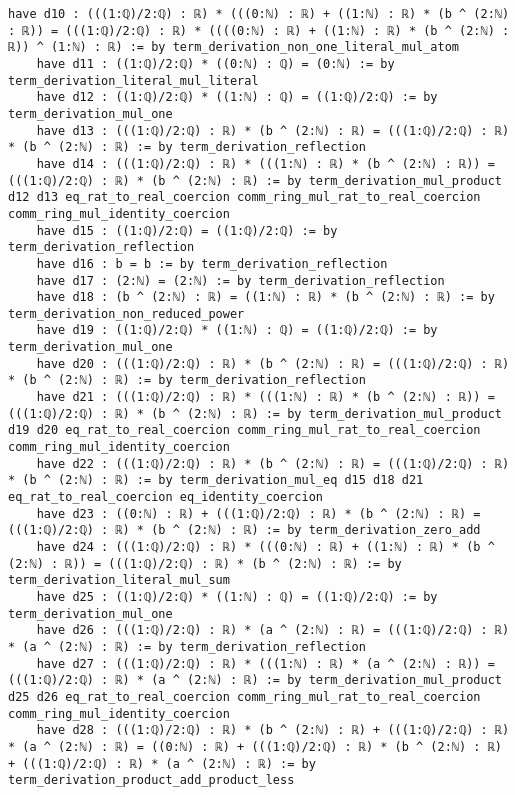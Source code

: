 \documentclass{article}
\begin{document}
\begin{tcolorbox}[colback=white!10, width=\linewidth]
\begin{lstlisting}[language=Lean4]
    have d10 : (((1:ℚ)/2:ℚ) : ℝ) * (((0:ℕ) : ℝ) + ((1:ℕ) : ℝ) * (b ^ (2:ℕ) : ℝ)) = (((1:ℚ)/2:ℚ) : ℝ) * ((((0:ℕ) : ℝ) + ((1:ℕ) : ℝ) * (b ^ (2:ℕ) : ℝ)) ^ (1:ℕ) : ℝ) := by term_derivation_non_one_literal_mul_atom
    have d11 : ((1:ℚ)/2:ℚ) * ((0:ℕ) : ℚ) = (0:ℕ) := by term_derivation_literal_mul_literal
    have d12 : ((1:ℚ)/2:ℚ) * ((1:ℕ) : ℚ) = ((1:ℚ)/2:ℚ) := by term_derivation_mul_one
    have d13 : (((1:ℚ)/2:ℚ) : ℝ) * (b ^ (2:ℕ) : ℝ) = (((1:ℚ)/2:ℚ) : ℝ) * (b ^ (2:ℕ) : ℝ) := by term_derivation_reflection
    have d14 : (((1:ℚ)/2:ℚ) : ℝ) * (((1:ℕ) : ℝ) * (b ^ (2:ℕ) : ℝ)) = (((1:ℚ)/2:ℚ) : ℝ) * (b ^ (2:ℕ) : ℝ) := by term_derivation_mul_product d12 d13 eq_rat_to_real_coercion comm_ring_mul_rat_to_real_coercion comm_ring_mul_identity_coercion
    have d15 : ((1:ℚ)/2:ℚ) = ((1:ℚ)/2:ℚ) := by term_derivation_reflection
    have d16 : b = b := by term_derivation_reflection
    have d17 : (2:ℕ) = (2:ℕ) := by term_derivation_reflection
    have d18 : (b ^ (2:ℕ) : ℝ) = ((1:ℕ) : ℝ) * (b ^ (2:ℕ) : ℝ) := by term_derivation_non_reduced_power
    have d19 : ((1:ℚ)/2:ℚ) * ((1:ℕ) : ℚ) = ((1:ℚ)/2:ℚ) := by term_derivation_mul_one
    have d20 : (((1:ℚ)/2:ℚ) : ℝ) * (b ^ (2:ℕ) : ℝ) = (((1:ℚ)/2:ℚ) : ℝ) * (b ^ (2:ℕ) : ℝ) := by term_derivation_reflection
    have d21 : (((1:ℚ)/2:ℚ) : ℝ) * (((1:ℕ) : ℝ) * (b ^ (2:ℕ) : ℝ)) = (((1:ℚ)/2:ℚ) : ℝ) * (b ^ (2:ℕ) : ℝ) := by term_derivation_mul_product d19 d20 eq_rat_to_real_coercion comm_ring_mul_rat_to_real_coercion comm_ring_mul_identity_coercion
    have d22 : (((1:ℚ)/2:ℚ) : ℝ) * (b ^ (2:ℕ) : ℝ) = (((1:ℚ)/2:ℚ) : ℝ) * (b ^ (2:ℕ) : ℝ) := by term_derivation_mul_eq d15 d18 d21 eq_rat_to_real_coercion eq_identity_coercion
    have d23 : ((0:ℕ) : ℝ) + (((1:ℚ)/2:ℚ) : ℝ) * (b ^ (2:ℕ) : ℝ) = (((1:ℚ)/2:ℚ) : ℝ) * (b ^ (2:ℕ) : ℝ) := by term_derivation_zero_add
    have d24 : (((1:ℚ)/2:ℚ) : ℝ) * (((0:ℕ) : ℝ) + ((1:ℕ) : ℝ) * (b ^ (2:ℕ) : ℝ)) = (((1:ℚ)/2:ℚ) : ℝ) * (b ^ (2:ℕ) : ℝ) := by term_derivation_literal_mul_sum
    have d25 : ((1:ℚ)/2:ℚ) * ((1:ℕ) : ℚ) = ((1:ℚ)/2:ℚ) := by term_derivation_mul_one
    have d26 : (((1:ℚ)/2:ℚ) : ℝ) * (a ^ (2:ℕ) : ℝ) = (((1:ℚ)/2:ℚ) : ℝ) * (a ^ (2:ℕ) : ℝ) := by term_derivation_reflection
    have d27 : (((1:ℚ)/2:ℚ) : ℝ) * (((1:ℕ) : ℝ) * (a ^ (2:ℕ) : ℝ)) = (((1:ℚ)/2:ℚ) : ℝ) * (a ^ (2:ℕ) : ℝ) := by term_derivation_mul_product d25 d26 eq_rat_to_real_coercion comm_ring_mul_rat_to_real_coercion comm_ring_mul_identity_coercion
    have d28 : (((1:ℚ)/2:ℚ) : ℝ) * (b ^ (2:ℕ) : ℝ) + (((1:ℚ)/2:ℚ) : ℝ) * (a ^ (2:ℕ) : ℝ) = ((0:ℕ) : ℝ) + (((1:ℚ)/2:ℚ) : ℝ) * (b ^ (2:ℕ) : ℝ) + (((1:ℚ)/2:ℚ) : ℝ) * (a ^ (2:ℕ) : ℝ) := by term_derivation_product_add_product_less

\end{lstlisting}
\end{tcolorbox}
\end{document}
